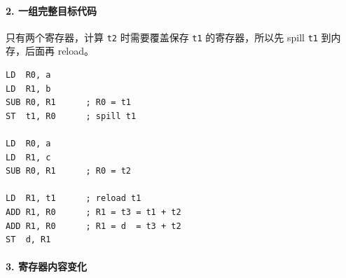 \documentclass[UTF8]{ctexart}
\begin{document}
\paragraph*{2. 一组完整目标代码}

只有两个寄存器，计算 \texttt{t2} 时需要覆盖保存 \texttt{t1} 的寄存器，所以先 spill \texttt{t1} 到内存，后面再 reload。

\begin{Verbatim}[fontsize=\small,breaklines=true]
LD  R0, a
LD  R1, b
SUB R0, R1      ; R0 = t1
ST  t1, R0      ; spill t1

LD  R0, a
LD  R1, c
SUB R0, R1      ; R0 = t2

LD  R1, t1      ; reload t1
ADD R1, R0      ; R1 = t3 = t1 + t2
ADD R1, R0      ; R1 = d  = t3 + t2
ST  d, R1
\end{Verbatim}

\paragraph*{3. 寄存器内容变化}
\end{document}
